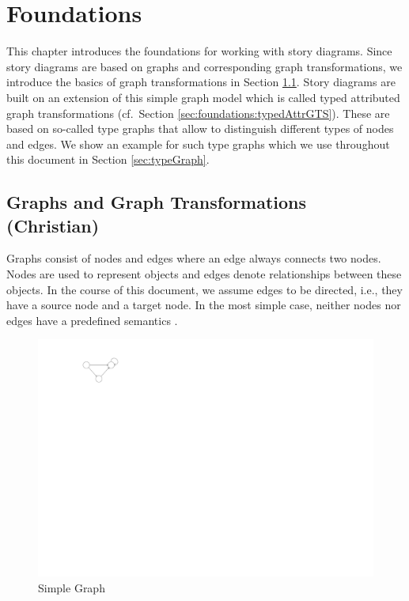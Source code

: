 \chapter{Foundations}
\label{sec:foundations}

This chapter introduces the foundations for working with story diagrams.
Since story diagrams are based on graphs and corresponding graph transformations,
we introduce the basics of graph transformations in Section \ref{sec:foundations:simpleGTS}.
Story diagrams are built on an extension of this simple graph model which is called typed attributed graph transformations (cf.\ Section \ref{sec:foundations:typedAttrGTS}).
These are based on so-called type graphs that allow to distinguish different types of nodes and edges.
We show an example for such type graphs which we use throughout this document in Section \ref{sec:typeGraph}.

\section{Graphs and Graph Transformations (Christian)}
\label{sec:foundations:simpleGTS}

Graphs consist of nodes and edges where an edge always connects two nodes. Nodes are used to represent objects and edges denote relationships between these objects. In the course of this document, we assume edges to be directed, i.e., they have a source node and a target node. In the most simple case, neither nodes nor edges have a predefined semantics \cite{Roz97}.

\begin{figure}[htbp]
  \centering
  \includegraphics[scale=1.5]{figures/SimpleGraph}
  \caption{Simple Graph}
  \label{fig:simpleGraph}
\end{figure}

